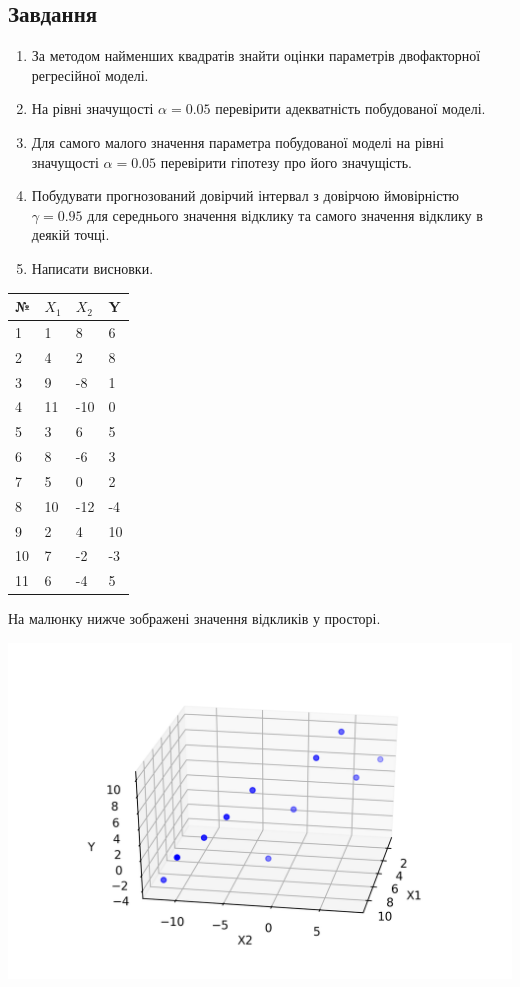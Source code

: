 \documentclass{article}
\begin{document}
    \subsection{Завдання}
      \begin{enumerate}
        \item За методом найменших квадратів знайти оцінки параметрів двофакторної регресійної моделі.
        \item На рівні значущості $\alpha = 0.05$ перевірити адекватність побудованої моделі.
        \item Для самого малого значення параметра побудованої моделі на рівні значущості $\alpha = 0.05$ перевірити гіпотезу про його значущість.
        \item Побудувати прогнозований довірчий інтервал з довірчою ймовірністю $\gamma = 0.95$ для середнього значення відклику та самого  значення відклику в деякій точці.
        \item Написати висновки.
      \end{enumerate}
      \begin{center}
        \begin{tabular}{|l|l|l|l|}
          \hline
          № & $X_1$ & $X_2$ & Y \\
          \hline
          1 & 1 & 8 & 6\\
          2 & 4 & 2 & 8\\
          3 & 9 & -8 & 1\\
          4 & 11 & -10 & 0\\
          5 & 3 & 6 & 5\\
          6 & 8 & -6 & 3\\
          7 & 5 & 0 & 2\\
          8 & 10 & -12 & -4\\
          9 & 2 & 4 & 10\\
          10 & 7 & -2 & -3\\
          11 & 6 & -4 & 5\\
          \hline
        \end{tabular}
      \end{center}
      \newpage
      На малюнку нижче зображені значення відкликів у просторі.
      \begin{center}
        \includegraphics[scale=0.8]{task2_data.png}
      \end{center}
\end{document}
